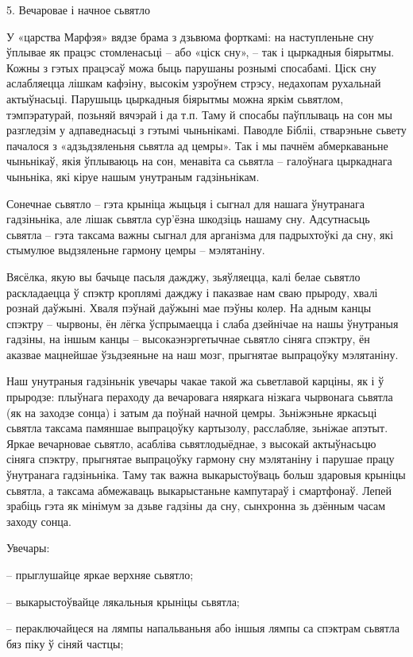 5. Вечаровае і начное сьвятло

У «царства Марфэя» вядзе брама з дзьвюма форткамі: на наступленьне сну ўплывае як працэс стомленасьці – або «ціск сну», – так і цыркадныя біярытмы. Кожны з гэтых працэсаў можа быць парушаны рознымі спосабамі. Ціск сну аслабляецца лішкам кафэіну, высокім узроўнем стрэсу, недахопам рухальнай актыўнасьці. Парушыць цыркадныя біярытмы можна яркім сьвятлом, тэмпэратурай, позьняй вячэрай і да т.п. Таму й спосабы паўплываць на сон мы разгледзім у адпаведнасьці з гэтымі чыньнікамі. Паводле Бібліі, стварэньне сьвету пачалося з «адзьдзяленьня сьвятла ад цемры». Так і мы пачнём абмеркаваньне чыньнікаў, якія ўплываюць на сон, менавіта са сьвятла – галоўнага цыркаднага чыньніка, які кіруе нашым унутраным гадзіньнікам.

Сонечнае сьвятло – гэта крыніца жыцьця і сыгнал для нашага ўнутранага гадзіньніка, але лішак сьвятла сур'ёзна шкодзіць нашаму сну. Адсутнасьць сьвятла – гэта таксама важны сыгнал для арганізма для падрыхтоўкі да сну, які стымулюе выдзяленьне гармону цемры – мэлятаніну.

Вясёлка, якую вы бачыце пасьля дажджу, зьяўляецца, калі белае сьвятло раскладаецца ў спэктр кроплямі дажджу і паказвае нам сваю прыроду, хвалі рознай даўжыні. Хваля пэўнай даўжыні мае пэўны колер. На адным канцы спэктру – чырвоны, ён лёгка ўспрымаецца і слаба дзейнічае на нашы ўнутраныя гадзіны, на іншым канцы – высокаэнэргетычнае сьвятло сіняга спэктру, ён аказвае мацнейшае ўзьдзеяньне на наш мозг, прыгнятае выпрацоўку мэлятаніну.

Наш унутраныя гадзіньнік увечары чакае такой жа сьветлавой карціны, як і ў прыродзе: плыўнага пераходу да вечаровага няяркага нізкага чырвонага сьвятла (як на заходзе сонца) і затым да поўнай начной цемры. Зьніжэньне яркасьці сьвятла таксама памяншае выпрацоўку картызолу, расслабляе, зьніжае апэтыт. Яркае вечарновае сьвятло, асабліва сьвятлодыёднае, з высокай актыўнасьцю сіняга спэктру, прыгнятае выпрацоўку гармону сну мэлятаніну і парушае працу ўнутранага гадзіньніка. Таму так важна выкарыстоўваць больш здаровыя крыніцы сьвятла, а таксама абмежаваць выкарыстаньне кампутараў і смартфонаў. Лепей зрабіць гэта як мінімум за дзьве гадзіны да сну, сынхронна зь дзённым часам заходу сонца.

Увечары:

– прыглушайце яркае верхняе сьвятло;

– выкарыстоўвайце лякальныя крыніцы сьвятла;

– пераключайцеся на лямпы напальваньня або іншыя лямпы са спэктрам сьвятла бяз піку ў сіняй частцы;


